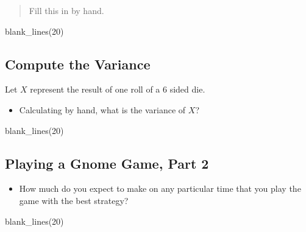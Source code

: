 \documentclass[
  letterpaper,
  DIV=11,
  numbers=noendperiod]{scrreprt}
\newenvironment{Shaded}{\begin{snugshade}}{\end{snugshade}}
\newcommand{\DecValTok}[1]{\textcolor[rgb]{0.68,0.00,0.00}{#1}}
\newcommand{\FunctionTok}[1]{\textcolor[rgb]{0.28,0.35,0.67}{#1}}
\newcommand{\NormalTok}[1]{\textcolor[rgb]{0.00,0.23,0.31}{#1}}
\providecommand{\tightlist}{%
  \setlength{\itemsep}{0pt}\setlength{\parskip}{0pt}}\usepackage{longtable,booktabs,array}
\begin{document}
\begin{quote}
Fill this in by hand.
\end{quote}

\begin{Shaded}
\begin{Highlighting}[]
\FunctionTok{blank\_lines}\NormalTok{(}\DecValTok{20}\NormalTok{)}
\end{Highlighting}
\end{Shaded}

\vspace{20cm}

\subsection{Compute the Variance}\label{compute-the-variance}

Let \(X\) represent the result of one roll of a 6 sided die.

\begin{itemize}
\tightlist
\item
  Calculating by hand, what is the variance of \(X\)?
\end{itemize}

\begin{Shaded}
\begin{Highlighting}[]
\FunctionTok{blank\_lines}\NormalTok{(}\DecValTok{20}\NormalTok{)}
\end{Highlighting}
\end{Shaded}

\vspace{20cm}

\subsection{Playing a Gnome Game, Part
2}\label{playing-a-gnome-game-part-2}

\begin{itemize}
\tightlist
\item
  How much do you expect to make on any particular time that you play
  the game with the best strategy?
\end{itemize}

\begin{Shaded}
\begin{Highlighting}[]
\FunctionTok{blank\_lines}\NormalTok{(}\DecValTok{20}\NormalTok{)}
\end{Highlighting}
\end{Shaded}

\vspace{20cm}
\end{document}
